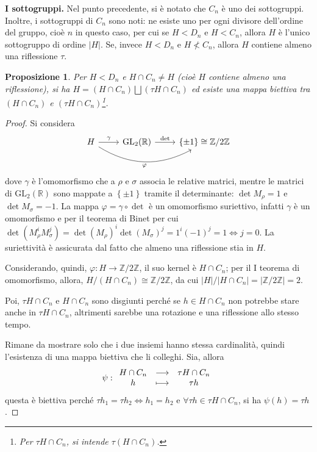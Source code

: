 \documentclass[12pt]{scrartcl}
\theoremstyle{style}
\newtheorem{prop}{Proposizione}[section]
\numberwithin{equation}{subsection}
\begin{document}
 \textbf{I sottogruppi.} 
Nel punto precedente, si \`e notato che $C_n$ \`e uno dei sottogruppi.
Inoltre, i sottogruppi di $C_n$ sono noti: ne esiste uno per ogni divisore dell'ordine del gruppo, cio\`e $n$ in questo caso, per cui se $H < D_n$ e $H < C_n$, allora $H$ \`e l'unico sottogruppo di ordine $\lvert H \rvert $.
Se, invece $H< D_n$ e $H \not < C_n$, allora $H$ contiene almeno una riflessione $\tau $.
\begin{prop}
	Per $H < D_n$ e $H\cap C_n \neq H$ (cio\`e $H$ contiene almeno una riflessione), si ha $H=(H \cap C_n) \bigsqcup (\tau H \cap C_n) $ ed esiste una mappa biettiva tra $(H\cap C_n)$ e $(\tau H\cap C_n)$\footnote{Per $\tau H\cap C_n$, si intende $\tau (H\cap C_n)$.}.
\end{prop}
	\begin{proof}
		Si considera 
	\[
\begin{tikzcd}
H \arrow[r, "\gamma"] 
    \arrow[rr, bend right=30, "{\varphi }"'] & 
\mathrm{GL}_2(\mathbb{R}) \arrow[r, "\det"] & \{\pm 1\}\cong \mathbb{Z}/2\mathbb{Z}
\end{tikzcd}
\]
dove $\gamma$ \`e l'omomorfismo che a $\rho $ e $\sigma $ associa le relative matrici, mentre le matrici di $\mathrm{GL} _2(\mathbb{R})$ sono mappate a $\left\{ \pm 1 \right\} $ tramite il determinante: $\det M_\rho  = 1$ e $\det M_\sigma = -1$.
La mappa $\varphi = \gamma\circ \det$ \`e un omomorfismo suriettivo, infatti $\gamma$ \`e un omomorfismo e per il teorema di Binet per cui $\det (M^i_\rho M^j_\sigma ) = \det(M_\rho )^i \det (M_\sigma )^j = 1 ^i (-1)^j = 1 \iff j= 0$. 
La suriettivit\`a \`e assicurata dal fatto che almeno una riflessione stia in $H$.

Considerando, quindi, $\varphi  :H \to \mathbb{Z} / 2\mathbb{Z}$, il suo kernel \`e $H\cap C_n$; per il I teorema di omomorfismo, allora, $H / (H\cap C_n) \cong \mathbb{Z} / 2\mathbb{Z}$, da cui $\lvert H \rvert / \lvert H\cap C_n \rvert = \lvert \mathbb{Z} / 2 \mathbb{Z} \rvert =2$.

Poi, $\tau H \cap C_n$ e $ H \cap C_n$ sono disgiunti perch\'e se $h \in H\cap C_n$ non potrebbe stare anche in $\tau H\cap C_n$, altrimenti sarebbe una rotazione e una riflessione allo stesso tempo.

Rimane da mostrare solo che i due insiemi hanno stessa cardinalit\`a, quindi l'esistenza di una mappa biettiva che li colleghi.
Sia, allora
\[
\psi  : 
\begin{array}
	{c c c}
	H \cap C_n & \longrightarrow  & \tau  H \cap C_n\\
	h & \longmapsto &\tau  h
\end{array}
\] 
questa \`e biettiva perch\'e $\tau h_1=\tau h_2 \iff h_1=h_2$ e $\forall \tau h\in \tau H \cap C_n$, si ha $\psi (h)=\tau h $.
\end{proof}
\end{document}
